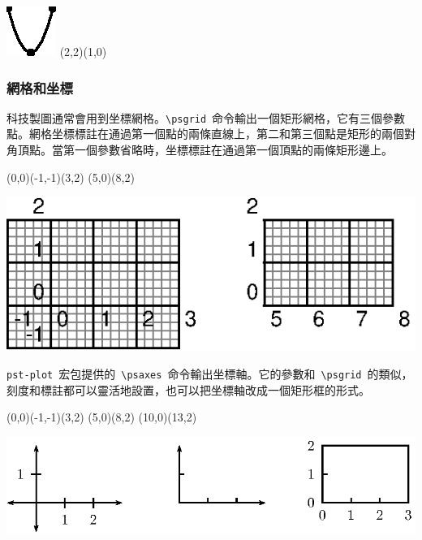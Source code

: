 \begin{fdemo}{\includegraphics{examples/pst_parabola.eps}}
\psparabola[showpoints=true]
    (2,2)(1,0)
\end{fdemo}

\subsubsection{網格和坐標}
科技製圖通常會用到坐標網格。\verb|\psgrid|~命令輸出一個矩形網格，它有三個參數點。網格坐標標註在通過第一個點的兩條直線上，第二和第三個點是矩形的兩個對角頂點。當第一個參數省略時，坐標標註在通過第一個頂點的兩條矩形邊上。

\begin{code}
\psgrid(0,0)(-1,-1)(3,2)
\psgrid(5,0)(8,2)
\end{code}
\begin{out}
\includegraphics{examples/pst_grid.eps}
\end{out}

\verb|pst-plot|~宏包提供的~\verb|\psaxes|~命令輸出坐標軸。它的參數和~\verb|\psgrid|~的類似，刻度和標註都可以靈活地設置，也可以把坐標軸改成一個矩形框的形式。
\begin{code}
\psaxes{<->}(0,0)(-1,-1)(3,2)
\psaxes[tickstyle=top,labels=none]{->}(5,0)(8,2)
\psaxes[axesstyle=frame,tickstyle=top]{->}(10,0)(13,2)
\end{code}
\begin{out}
\includegraphics{examples/pst_axis.eps}
\end{out}


